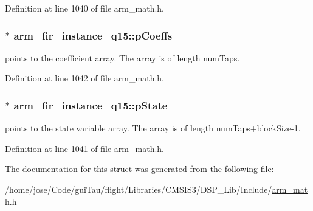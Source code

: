 Definition at line 1040 of file arm\-\_\-math.\-h.

\hypertarget{structarm__fir__instance__q15_a6d16db16a5f8f0db54938f2967244d9e}{
\subsubsection[{p\-Coeffs}]{$\ast$ arm\-\_\-fir\-\_\-instance\-\_\-q15\-::p\-Coeffs}}\label{structarm__fir__instance__q15_a6d16db16a5f8f0db54938f2967244d9e}
points to the coefficient array. The array is of length num\-Taps. 

Definition at line 1042 of file arm\-\_\-math.\-h.

\hypertarget{structarm__fir__instance__q15_aa8d25f44f45b6a6c4cf38c31569b8a01}{
\subsubsection[{p\-State}]{$\ast$ arm\-\_\-fir\-\_\-instance\-\_\-q15\-::p\-State}}\label{structarm__fir__instance__q15_aa8d25f44f45b6a6c4cf38c31569b8a01}
points to the state variable array. The array is of length num\-Taps+block\-Size-\/1. 

Definition at line 1041 of file arm\-\_\-math.\-h.



The documentation for this struct was generated from the following file\-:\begin{DoxyCompactItemize}
\item 
/home/jose/\-Code/gui\-Tau/flight/\-Libraries/\-C\-M\-S\-I\-S3/\-D\-S\-P\-\_\-\-Lib/\-Include/\hyperlink{arm__math_8h}{arm\-\_\-math.\-h}\end{DoxyCompactItemize}
